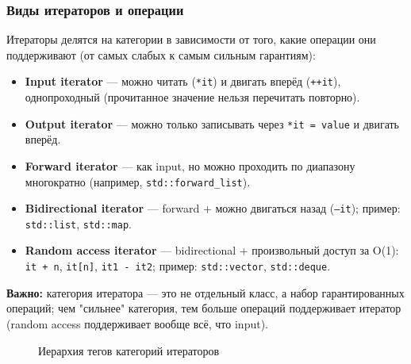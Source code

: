 \subsubsection{Виды итераторов и операции}
Итераторы делятся на категории в зависимости от того, какие операции они поддерживают (от самых слабых к самым сильным гарантиям):
\begin{itemize}
  \item \textbf{Input iterator} --- можно читать (\texttt{*it}) и двигать вперёд (\texttt{++it}), однопроходный (прочитанное значение нельзя перечитать повторно).
  \item \textbf{Output iterator} --- можно только записывать через \texttt{*it = value} и двигать вперёд.
  \item \textbf{Forward iterator} --- как input, но можно проходить по диапазону многократно (например, \texttt{std::forward\_list}).
  \item \textbf{Bidirectional iterator} --- forward + можно двигаться назад (\texttt{--it}); пример: \texttt{std::list}, \texttt{std::map}.
  \item \textbf{Random access iterator} --- bidirectional + произвольный доступ за O(1): \texttt{it + n}, \texttt{it[n]}, \texttt{it1 - it2}; пример: \texttt{std::vector}, \texttt{std::deque}.
\end{itemize}
\textbf{Важно:} категория итератора --- это не отдельный класс, а набор гарантированных операций; чем "сильнее" категория, тем больше операций поддерживает итератор (random access поддерживает вообще всё, что input).

\begin{figure}[htp]
\centering
{}
\caption{Иерархия тегов категорий итераторов}
\end{figure}


